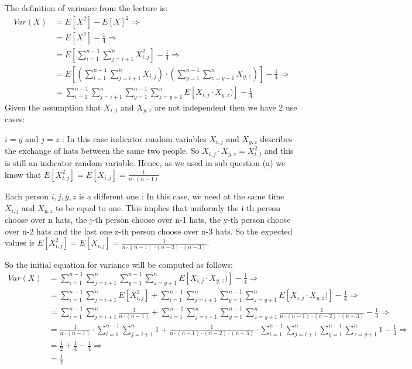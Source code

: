 \documentclass[11pt]{537homework}
\begin{document}
\subsection{}
The definition of variance from the lecture is:
\begingroup
\allowdisplaybreaks
\begin{align*}
 Var(X) &= E[X^2] - E[X]^2 \Longrightarrow \\ 
        &= E[X^2] - \frac{1}{4} \Longrightarrow \\ 
        &= E[ \sum_{i=1}^{n-1} \sum_{j=i+1}^{n} X_{i,j}^2] - \frac{1}{4} \Longrightarrow \\ 
        &= E[(\sum_{i=1}^{n-1} \sum_{j=i+1}^{n} X_{i,j})\cdot (\sum_{y=1}^{n-1} \sum_{z=y+1}^{n} X_{y,z})] - \frac{1}{4} \Longrightarrow \\ 
        &= \sum_{i=1}^{n-1} \sum_{j=i+1}^{n} \sum_{y=1}^{n-1} \sum_{z=y+1}^{n} E[X_{i,j} \cdot X_{y,z})] - \frac{1}{4} 
\end{align*}
\endgroup
Given the assumption that $X_{i,j}$ and $X_{y,z}$ are not independent then we have 2 use cases:
\begin{description}[font=$\bullet$]
\item $i=y$ and $j=z$ : In this case indicator random variables $X_{i,j}$ and $X_{y,z}$ describes the exchange of hats between the same two people. So $X_{i,j} \cdot X_{y,z} = X_{i,j}^2$ and this is still an indicator random variable. Hence, as we used in sub question (a) we know that $ E[X_{i,j}^2] = E[X_{i,j}]= \frac{1}{n \cdot (n-1)}$
\item Each person $i,j,y,z$ is a different one : In this case, we need at the same time $X_{i,j}$ and $X_{y,z}$ to be equal to one. This implies that uniformly the i-th person choose over n hats, the j-th person choose over n-1 hats, the y-th person choose over n-2 hats and the last one z-th person choose over n-3 hats. So the expected values is $ E[X_{i,j}^2] = E[X_{i,j}]= \frac{1}{n \cdot (n-1) \cdot (n-2) \cdot (n-3)}$. 
\end{description}
So the initial equation for variance will be computed as follows:\\
\begingroup
\allowdisplaybreaks
\begin{align*}
 Var(X) &= \sum_{i=1}^{n-1} \sum_{j=i+1}^{n} \sum_{y=1}^{n-1} \sum_{z=y+1}^{n} E[X_{i,j} \cdot X_{y,z})] - \frac{1}{4} \Longrightarrow \\
        &= \sum_{i=1}^{n-1} \sum_{j=i+1}^{n} E[X_{i,j}^2] + \sum_{i=1}^{n-1} \sum_{j=i+1}^{n} \sum_{y=1}^{n-1} \sum_{z=y+1}^{n} E[X_{i,j} \cdot X_{y,z})] - \frac{1}{4} \Longrightarrow \\
        &= \sum_{i=1}^{n-1} \sum_{j=i+1}^{n} \frac{1}{n \cdot (n-1)} + \sum_{i=1}^{n-1} \sum_{j=i+1}^{n} \sum_{y=1}^{n-1} \sum_{z=y+1}^{n} \frac{1}{n \cdot (n-1) \cdot (n-2) \cdot (n-3)} - \frac{1}{4} \Longrightarrow \\
        &= \frac{1}{n \cdot (n-1)} \cdot \sum_{i=1}^{n-1} \sum_{j=i+1}^{n} 1 + \frac{1}{n \cdot (n-1) \cdot (n-2) \cdot (n-3)} \cdot \sum_{i=1}^{n-1} \sum_{j=i+1}^{n} \sum_{y=1}^{n-1} \sum_{z=y+1}^{n} 1 - \frac{1}{4} \Longrightarrow \\
        &= \frac{1}{2} + \frac{1}{4} - \frac{1}{4} \Longrightarrow \\
        &= \frac{1}{2}
\end{align*}
\end{document}
